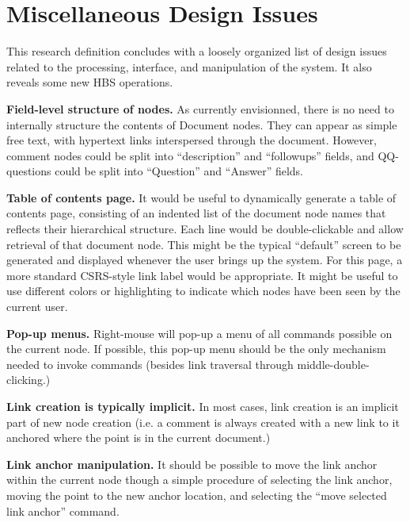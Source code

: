 \section{Miscellaneous Design Issues}

This research definition concludes with a loosely organized list of 
design issues related to the processing, interface, and manipulation of 
the system.  It also reveals some new HBS operations.

\begin{itemizenoindent}
  
\item {\bf Field-level structure of nodes.} As currently envisionned, there is no need
  to internally structure the contents of Document nodes.  They can appear as
  simple free text, with hypertext links interspersed through the document.
  However, comment nodes could be split into ``description'' and
  ``followups'' fields, and QQ-questions could be split into ``Question'' and
  ``Answer'' fields.
  
\item {\bf Table of contents page.} It would be useful to dynamically
  generate a table of contents page, consisting of an indented list of the
  document node names that reflects their hierarchical structure.  Each line would
  be double-clickable and allow retrieval of that document node.  This
  might be the typical ``default'' screen to be generated and displayed
  whenever the user brings up the system.  For this page, a more standard
  CSRS-style link label would be appropriate.  It might be useful to use
  different colors or highlighting to indicate which nodes have been seen
  by the current user. 
  
\item {\bf Pop-up menus.} Right-mouse will pop-up a menu of all commands
  possible on the current node. If possible, this pop-up menu should be the
  only mechanism needed to invoke commands (besides link traversal through
  middle-double-clicking.)
  
\item {\bf Link creation is typically implicit.} In most cases, link
  creation is an implicit part of new node creation (i.e. a comment is
  always created with a new link to it anchored where the point is in the
  current document.)
  
\item {\bf Link anchor manipulation.} It should be possible to move the
  link anchor within the current node though a simple procedure of selecting
  the link anchor, moving the point to the new anchor location, and selecting
  the ``move selected link anchor'' command.


\end{itemizenoindent}
